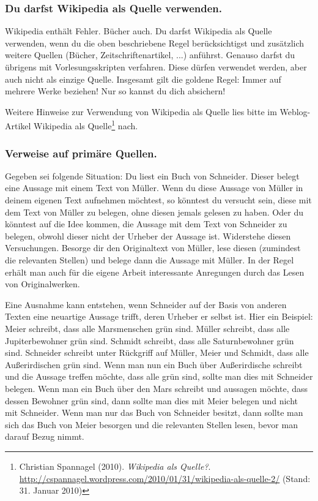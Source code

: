 \documentclass{../cssheet}
\begin{document}
\subsubsection*{Du darfst Wikipedia als Quelle verwenden.}

Wikipedia enthält Fehler. Bücher auch. Du darfst Wikipedia als Quelle
verwenden, wenn du die oben beschriebene Regel berücksichtigst und
zusätzlich weitere Quellen (Bücher, Zeitschriftenartikel, ...) anführst.
Genauso darfst du übrigens mit Vorlesungsskripten verfahren. Diese
dürfen verwendet werden, aber auch nicht als einzige Quelle. Insgesamt
gilt die goldene Regel: Immer auf mehrere Werke beziehen! Nur so kannst
du dich absichern!

Weitere Hinweise zur Verwendung von Wikipedia als Quelle lies bitte im
Weblog-Artikel \glqq{}Wikipedia als Quelle\grqq{}\footnote{Christian Spannagel (2010). \emph{Wikipedia als Quelle?}. \url{http://cspannagel.wordpress.com/2010/01/31/wikipedia-als-quelle-2/} (Stand: 31. Januar 2010)} nach.

\subsubsection*{Verweise auf primäre Quellen.}

Gegeben sei folgende Situation: Du liest ein Buch von Schneider. Dieser
belegt eine Aussage mit einem Text von Müller. Wenn du diese Aussage von
Müller in deinem eigenen Text aufnehmen möchtest, so könntest du
versucht sein, diese mit dem Text von Müller zu belegen, ohne diesen
jemals gelesen zu haben. Oder du könntest auf die Idee kommen, die
Aussage mit dem Text von Schneider zu belegen, obwohl dieser nicht der
Urheber der Aussage ist. Widerstehe diesen Versuchungen. Besorge dir den
Originaltext von Müller, lese diesen (zumindest die relevanten Stellen)
und belege dann die Aussage mit Müller. In der Regel erhält man auch für
die eigene Arbeit interessante Anregungen durch das Lesen von
Originalwerken.

Eine Ausnahme kann entstehen, wenn Schneider auf der Basis von anderen
Texten eine neuartige Aussage trifft, deren Urheber er selbst ist. Hier
ein Beispiel: Meier schreibt, dass alle Marsmenschen grün sind. Müller
schreibt, dass alle Jupiterbewohner grün sind. Schmidt schreibt, dass
alle Saturnbewohner grün sind. Schneider schreibt unter Rückgriff auf
Müller, Meier und Schmidt, dass alle Außerirdischen grün sind. Wenn man
nun ein Buch über Außerirdische schreibt und die Aussage treffen möchte,
dass alle grün sind, sollte man dies mit Schneider belegen. Wenn man ein
Buch über den Mars schreibt und aussagen möchte, dass dessen Bewohner
grün sind, dann sollte man dies mit Meier belegen und nicht mit
Schneider. Wenn man nur das Buch von Schneider besitzt, dann sollte man
sich das Buch von Meier besorgen und die relevanten Stellen lesen, bevor
man darauf Bezug nimmt.
\end{document}
